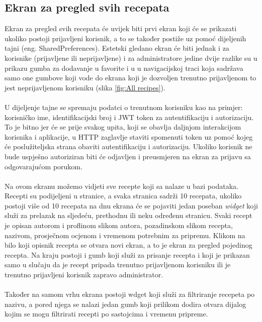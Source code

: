 \documentclass[times, utf8, zavrsni]{fer}
\begin{document}
\subsection{Ekran za pregled svih recepata}
Ekran za pregled svih recepata će uvijek biti prvi ekran koji će se prikazati ukoliko postoji
prijavljeni korisnik, a to se također postiže uz pomoć dijeljenih tajni (eng. SharedPreferences).
Estetski gledano ekran će biti jednak i za korisnike (prijavljene ili neprijavljene) i za administratore jedine dvije
razlike su u prikazu gumba za dodavanje u favorite i u
u navigacijskoj traci koja sadržava samo one gumbove koji vode do ekrana koji je dozvoljen
trenutno prijavljenom to jest neprijavljenom korisniku (slika \ref{fig:All recipes}).
\\\\
U dijeljenje tajne se spremaju podatci o trenutnom korisniku kao na primjer: korisničko ime, identifikacijski
broj i JWT token za autentifikaciju i autorizaciju.
To je bitno jer će se prije svakog upita, koji se obavlja daljnjom interakcijom
korisnika i aplikacije, u HTTP zaglavlje staviti spomenuti token uz pomoć kojeg će
poslužiteljska strana obaviti autentifikaciju i autorizaciju. Ukoliko korisnik ne bude uspješno
autoriziran biti će odjavljen i preusmjeren na ekran za prijavu sa odgovarajućom porukom.
\\\\
Na ovom ekranu možemo vidjeti sve recepte koji sa nalaze u bazi podataka. Recepti su podijeljeni u stranice,
a svaka stranica sadrži 10 recepata, ukoliko postoji više od 10 recepata na dnu ekrana će se pojaviti
jedan poseban \textit{widget} koji služi za prelazak na sljedeću, prethodnu ili neku određenu stranicu.
Svaki recept je opisan autorom i proflinom slikom autora, pozadinskom slikom recepta, nazivom,
prosječnom ocjenom i vremenom potrebnim za pripremu. Klikom na bilo koji opisnik recepta se otvara novi ekran,
a to je ekran za pregled pojedinog recepta. Na kraju postoji i gumb koji služi za prisanje recepta i koji
je prikazan samo u slučaju da je recept pripada trenutno prijavljenom korisniku ili je trenutno prijavljeni
korisnik zapravo administrator.
\\\\
Također na samom vrhu ekrana postoji wdget koji služi za filtriranje recepeta po nazivu,
a pored njega se nalazi jedan gumb koji prilikom dodira otvara dijalog kojim
se mogu filtrirati recepti po sastojcima i vremenu pripreme.
\end{document}
